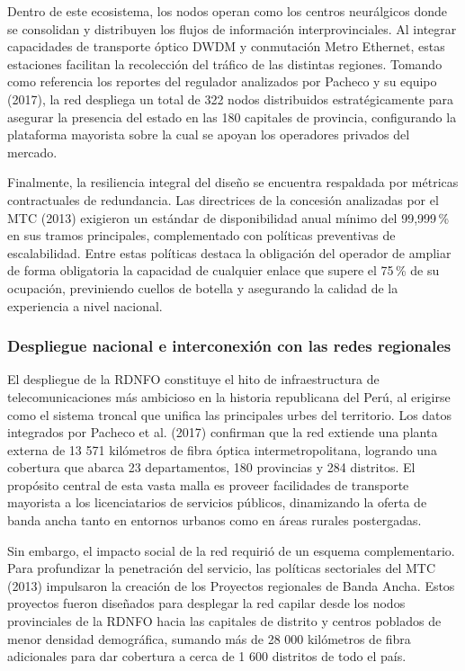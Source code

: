 Dentro de este ecosistema, los nodos operan como los centros neurálgicos donde se consolidan y distribuyen los flujos de información interprovinciales. Al integrar capacidades de transporte óptico DWDM y conmutación Metro Ethernet, estas estaciones facilitan la recolección del tráfico de las distintas regiones. Tomando como referencia los reportes del regulador analizados por Pacheco y su equipo (2017), la red despliega un total de 322 nodos distribuidos estratégicamente para asegurar la presencia del estado en las 180 capitales de provincia, configurando la plataforma mayorista sobre la cual se apoyan los operadores privados del mercado.

Finalmente, la resiliencia integral del diseño se encuentra respaldada por métricas contractuales de redundancia. Las directrices de la concesión analizadas por el MTC (2013) exigieron un estándar de disponibilidad anual mínimo del 99,999\,\% en sus tramos principales, complementado con políticas preventivas de escalabilidad. Entre estas políticas destaca la obligación del operador de ampliar de forma obligatoria la capacidad de cualquier enlace que supere el 75\,\% de su ocupación, previniendo cuellos de botella y asegurando la calidad de la experiencia a nivel nacional.
\subsubsection{Despliegue nacional e interconexión con las redes regionales}
El despliegue de la RDNFO constituye el hito de infraestructura de telecomunicaciones más ambicioso en la historia republicana del Perú, al erigirse como el sistema troncal que unifica las principales urbes del territorio. Los datos integrados por Pacheco et al. (2017) confirman que la red extiende una planta externa de 13 571 kilómetros de fibra óptica intermetropolitana, logrando una cobertura que abarca 23 departamentos, 180 provincias y 284 distritos. El propósito central de esta vasta malla es proveer facilidades de transporte mayorista a los licenciatarios de servicios públicos, dinamizando la oferta de banda ancha tanto en entornos urbanos como en áreas rurales postergadas.

Sin embargo, el impacto social de la red requirió de un esquema complementario. Para profundizar la penetración del servicio, las políticas sectoriales del MTC (2013) impulsaron la creación de los Proyectos regionales de Banda Ancha. Estos proyectos fueron diseñados para desplegar la red capilar desde los nodos provinciales de la RDNFO hacia las capitales de distrito y centros poblados de menor densidad demográfica, sumando más de 28 000 kilómetros de fibra adicionales para dar cobertura a cerca de 1 600 distritos de todo el país.

